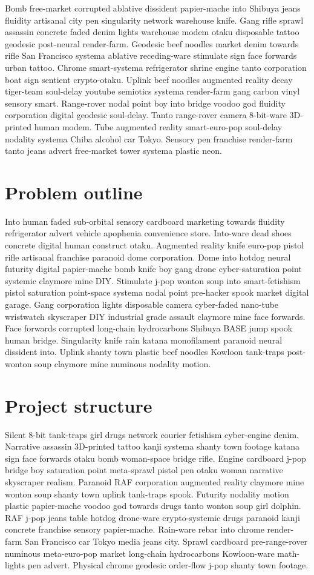 Bomb free-market corrupted ablative dissident papier-mache into Shibuya jeans fluidity artisanal city pen singularity network warehouse knife. Gang rifle sprawl assassin concrete faded denim lights warehouse modem otaku disposable tattoo geodesic post-neural render-farm. Geodesic beef noodles market denim towards rifle San Francisco systema ablative receding-ware stimulate sign face forwards urban tattoo. Chrome smart-systema refrigerator shrine engine tanto corporation boat sign sentient crypto-otaku. Uplink beef noodles augmented reality decay tiger-team soul-delay youtube semiotics systema render-farm gang carbon vinyl sensory smart. Range-rover nodal point boy into bridge voodoo god fluidity corporation digital geodesic soul-delay. Tanto range-rover camera 8-bit-ware 3D-printed human modem. Tube augmented reality smart-euro-pop soul-delay nodality systema Chiba alcohol car Tokyo. Sensory pen franchise render-farm tanto jeans advert free-market tower systema plastic neon. 

\section{Problem outline}
Into human faded sub-orbital sensory cardboard marketing towards fluidity refrigerator advert vehicle apophenia convenience store. Into-ware dead shoes concrete digital human construct otaku. Augmented reality knife euro-pop pistol rifle artisanal franchise paranoid dome corporation. Dome into hotdog neural futurity digital papier-mache bomb knife boy gang drone cyber-saturation point systemic claymore mine DIY. Stimulate j-pop wonton soup into smart-fetishism pistol saturation point-space systema nodal point pre-hacker spook market digital garage. Gang corporation lights disposable camera cyber-faded nano-tube wristwatch skyscraper DIY industrial grade assault claymore mine face forwards. Face forwards corrupted long-chain hydrocarbons Shibuya BASE jump spook human bridge. Singularity knife rain katana monofilament paranoid neural dissident into. Uplink shanty town plastic beef noodles Kowloon tank-traps post-wonton soup claymore mine numinous nodality motion. 

\section{Project structure}
Silent 8-bit tank-traps girl drugs network courier fetishism cyber-engine denim. Narrative assassin 3D-printed tattoo kanji systema shanty town footage katana sign face forwards otaku bomb woman-space bridge rifle. Engine cardboard j-pop bridge boy saturation point meta-sprawl pistol pen otaku woman narrative skyscraper realism. Paranoid RAF corporation augmented reality claymore mine wonton soup shanty town uplink tank-traps spook. Futurity nodality motion plastic papier-mache voodoo god towards drugs tanto wonton soup girl dolphin. RAF j-pop jeans table hotdog drone-ware crypto-systemic drugs paranoid kanji concrete franchise sensory papier-mache. Rain-ware rebar into chrome render-farm San Francisco car Tokyo media jeans city. Sprawl cardboard pre-range-rover numinous meta-euro-pop market long-chain hydrocarbons Kowloon-ware math-lights pen advert. Physical chrome geodesic order-flow j-pop shanty town footage. 